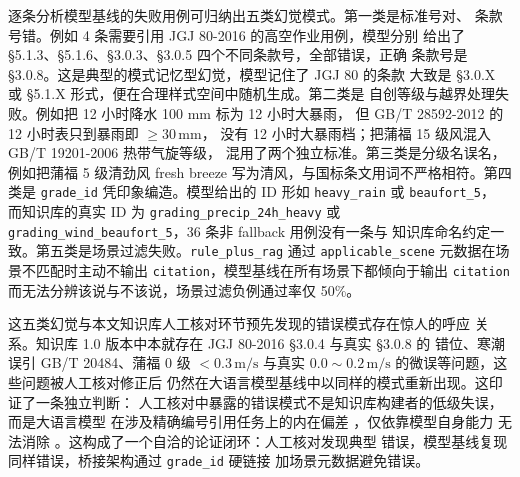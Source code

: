 逐条分析模型基线的失败用例可归纳出五类幻觉模式。第一类是标准号对、
条款号错。例如 4 条需要引用 JGJ 80-2016 的高空作业用例，模型分别
给出了 §5.1.3、§5.1.6、§3.0.3、§3.0.5 四个不同条款号，全部错误，正确
条款号是 §3.0.8。这是典型的模式记忆型幻觉，模型记住了 JGJ 80 的条款
大致是 §3.0.X 或 §5.1.X 形式，便在合理样式空间中随机生成。第二类是
自创等级与越界处理失败。例如把 12 小时降水 100 mm 标为 12 小时大暴雨，
但 GB/T 28592-2012 的 12 小时表只到暴雨即 $\geq 30\,\mathrm{mm}$，
没有 12 小时大暴雨档；把蒲福 15 级风混入 GB/T 19201-2006 热带气旋等级，
混用了两个独立标准。第三类是分级名误名，例如把蒲福 5 级清劲风 fresh
breeze 写为清风，与国标条文用词不严格相符。第四类是 \texttt{grade\_\bk{}id}
凭印象编造。模型给出的 ID 形如 \texttt{heavy\_\bk{}rain} 或 \texttt{beaufort\_\bk{}5}，
而知识库的真实 ID 为 \texttt{grading\_\bk{}precip\_\bk{}24h\_\bk{}heavy} 或
\texttt{grading\_\bk{}wind\_\bk{}beaufort\_\bk{}5}，36 条非 fallback 用例没有一条与
知识库命名约定一致。第五类是场景过滤失败。\texttt{rule\_\bk{}plus\_\bk{}rag}
通过 \texttt{applicable\_\bk{}scene} 元数据在场景不匹配时主动不输出
\texttt{citation}，模型基线在所有场景下都倾向于输出 \texttt{citation}
而无法分辨该说与不该说，场景过滤负例通过率仅 50\%。

这五类幻觉与本文知识库人工核对环节预先发现的错误模式存在惊人的呼应
关系。知识库 1.0 版本中本就存在 JGJ 80-2016 §3.0.4 与真实 §3.0.8 的
错位、寒潮误引 GB/T 20484、蒲福 0 级 $<0.3\,\mathrm{m/s}$ 与真实
$0.0\sim0.2\,\mathrm{m/s}$ 的微误等问题，这些问题被人工核对修正后
仍然在大语言模型基线中以同样的模式重新出现。这印证了一条独立判断：
人工核对中暴露的错误模式不是知识库构建者的低级失误，而是大语言模型
在涉及精确编号引用任务上的内在偏差 \cite{ref20}，仅依靠模型自身能力
无法消除 \cite{ref10}。这构成了一个自洽的论证闭环：人工核对发现典型
错误，模型基线复现同样错误，桥接架构通过 \texttt{grade\_\bk{}id} 硬链接
加场景元数据避免错误。

